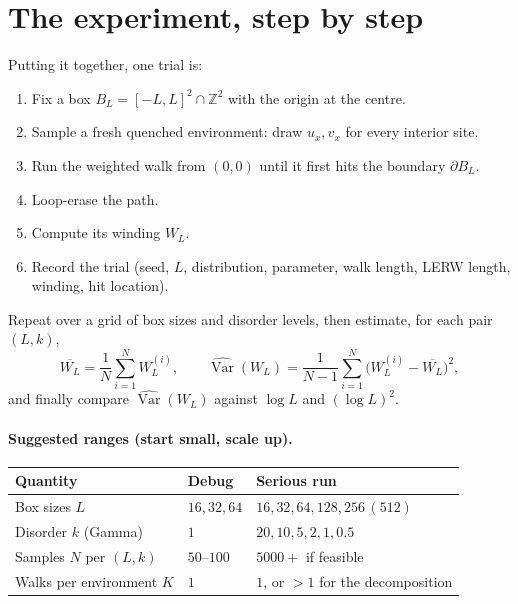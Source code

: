 \documentclass[11pt]{article}
\theoremstyle{definition}
\theoremstyle{plain}
\newcommand{\Z}{\mathbb{Z}}
\newcommand{\Var}{\operatorname{Var}}
\newcommand{\BL}{B_{L}}
\newcommand{\Wind}{W_{L}}
\begin{document}
\section{The experiment, step by step}

Putting it together, one trial is:

\begin{enumerate}[leftmargin=2em,itemsep=2pt]
  \item Fix a box $\BL=[-L,L]^2\cap\Z^2$ with the origin at the centre.
  \item Sample a fresh quenched environment: draw $u_x,v_x$ for every interior
        site.
  \item Run the weighted walk from $(0,0)$ until it first hits the boundary
        $\partial\BL$.
  \item Loop-erase the path.
  \item Compute its winding $\Wind$.
  \item Record the trial (seed, $L$, distribution, parameter, walk length,
        LERW length, winding, hit location).
\end{enumerate}

Repeat over a grid of box sizes and disorder levels, then estimate, for each
pair $(L,k)$,
\[
   \overline{\Wind}=\frac1N\sum_{i=1}^N \Wind^{(i)},\qquad
   \widehat{\Var}(\Wind)=\frac{1}{N-1}\sum_{i=1}^N\big(\Wind^{(i)}-\overline{\Wind}\big)^2,
\]
and finally compare $\widehat{\Var}(\Wind)$ against $\log L$ and $(\log L)^2$.

\paragraph{Suggested ranges (start small, scale up).}
\begin{center}
\begin{tabular}{@{}lll@{}}
\toprule
Quantity & Debug & Serious run \\
\midrule
Box sizes $L$        & $16,32,64$            & $16,32,64,128,256\,(512)$ \\
Disorder $k$ (Gamma) & $1$                   & $20,10,5,2,1,0.5$ \\
Samples $N$ per $(L,k)$ & $50$--$100$        & $5000+$ if feasible \\
Walks per environment $K$ & $1$              & $1$, or $>1$ for the decomposition \\
\bottomrule
\end{tabular}
\end{center}
\end{document}
